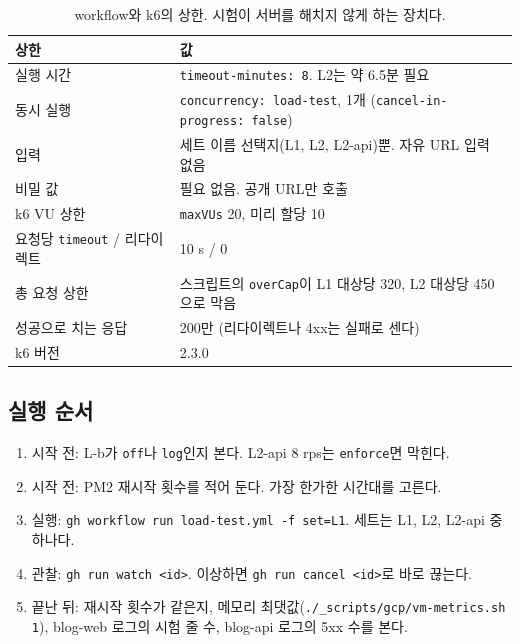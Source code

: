 \begin{table}[H]
  \caption{workflow와 k6의 상한. 시험이 서버를 해치지 않게 하는 장치다.}\label{tab:07-caps}
  \small
  \begin{tabularx}{\linewidth}{L{4.6cm} Y}
    \toprule
    상한 & 값 \\
    \midrule
    실행 시간 & \texttt{timeout-minutes: 8}. L2는 약 6.5분 필요 \\
    \midrule
    동시 실행 & \texttt{concurrency: load-test}, 1개 (\texttt{cancel-in-progress: false}) \\
    \midrule
    입력 & 세트 이름 선택지(L1, L2, L2-api)뿐. 자유 URL 입력 없음 \\
    \midrule
    비밀 값 & 필요 없음. 공개 URL만 호출 \\
    \midrule
    k6 VU 상한 & \texttt{maxVUs} 20, 미리 할당 10 \\
    \midrule
    요청당 \texttt{timeout} / 리다이렉트 & 10 s / 0 \\
    \midrule
    총 요청 상한 & 스크립트의 \texttt{overCap}이 L1 대상당 320, L2 대상당 450으로 막음 \\
    \midrule
    성공으로 치는 응답 & 200만 (리다이렉트나 4xx는 실패로 센다) \\
    \midrule
    k6 버전 & 2.3.0 \\
    \bottomrule
  \end{tabularx}
\end{table}

\subsection{실행 순서}\label{sec:07-k6-run}

\begin{enumerate}[nosep]
  \item 시작 전: L-b가 \texttt{off}나 \texttt{log}인지 본다. L2-api 8 rps는 \texttt{enforce}면 막힌다.
  \item 시작 전: PM2 재시작 횟수를 적어 둔다. 가장 한가한 시간대를 고른다.
  \item 실행: \texttt{gh workflow run load-test.yml -f set=L1}. 세트는 L1, L2, L2-api 중 하나다.
  \item 관찰: \texttt{gh run watch <id>}. 이상하면 \texttt{gh run cancel <id>}로 바로 끊는다.
  \item 끝난 뒤: 재시작 횟수가 같은지, 메모리 최댓값(\texttt{./\_scripts/gcp/vm-metrics.sh 1}), blog-web 로그의 시험 줄 수, blog-api 로그의 5xx 수를 본다.
\end{enumerate}

